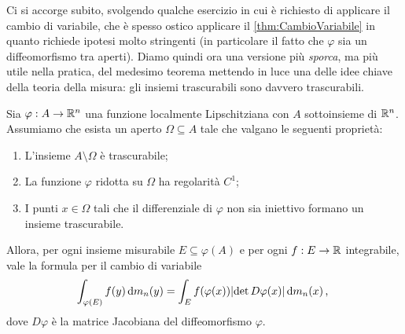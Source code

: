Ci si accorge subito, svolgendo qualche esercizio in cui è richiesto di applicare il cambio di variabile, che è spesso ostico applicare il \cref{thm:CambioVariabile} in quanto richiede ipotesi molto stringenti (in particolare il fatto che $\varphi$ sia un diffeomorfismo tra aperti). 
Diamo quindi ora una versione più \emph{sporca}, ma più utile nella pratica, del medesimo teorema mettendo in luce una delle idee chiave della teoria della misura: gli insiemi trascurabili sono davvero trascurabili.

\begin{corollary}\label{thm:CambioVariabileSporco}
	Sia $\varphi:A\to\mathbb R^n$ una funzione localmente Lipschitziana con $A$ sottoinsieme di $\mathbb R^n$.
	Assumiamo che esista un aperto $\Omega\subseteq A$ tale che valgano le seguenti proprietà:
	\begin{enumerate}
		\item L'insieme $A\setminus \Omega$ è trascurabile;
		\item La funzione $\varphi$ ridotta su $\Omega$ ha regolarità $C^1$;
		\item I punti $x\in\Omega$ tali che il differenziale di $\varphi$ non sia iniettivo formano un insieme trascurabile.
	\end{enumerate}
	
	Allora, per ogni insieme misurabile $E\subseteq \varphi(A)$ e per ogni $f:E\to\mathbb R$ integrabile, vale la formula per il cambio di variabile
	\begin{equation*}
		\int_{\varphi(E)} f(y)\,\mathrm d m_n(y) = \int_{E} f(\varphi(x))\lvert \det D\varphi(x) \rvert \,\mathrm d m_n(x) \, \text{, }
	\end{equation*}
	dove $D\varphi$ è la matrice Jacobiana del diffeomorfismo $\varphi$.
\end{corollary}
